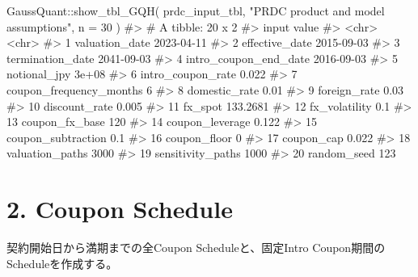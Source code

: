 \documentclass[
  letterpaper,
  DIV=11,
  numbers=noendperiod]{scrreprt}
\newenvironment{Shaded}{\begin{snugshade}}{\end{snugshade}}
\newcommand{\AttributeTok}[1]{\textcolor[rgb]{0.40,0.45,0.13}{#1}}
\newcommand{\CommentTok}[1]{\textcolor[rgb]{0.37,0.37,0.37}{#1}}
\newcommand{\DecValTok}[1]{\textcolor[rgb]{0.68,0.00,0.00}{#1}}
\newcommand{\FunctionTok}[1]{\textcolor[rgb]{0.28,0.35,0.67}{#1}}
\newcommand{\NormalTok}[1]{\textcolor[rgb]{0.00,0.23,0.31}{#1}}
\newcommand{\SpecialCharTok}[1]{\textcolor[rgb]{0.37,0.37,0.37}{#1}}
\newcommand{\StringTok}[1]{\textcolor[rgb]{0.13,0.47,0.30}{#1}}
\begin{document}
\begin{Shaded}
\begin{Highlighting}[]
\NormalTok{GaussQuant}\SpecialCharTok{::}\FunctionTok{show\_tbl\_GQH}\NormalTok{(}
\NormalTok{  prdc\_input\_tbl,}
  \StringTok{"PRDC product and model assumptions"}\NormalTok{,}
  \AttributeTok{n =} \DecValTok{30}
\NormalTok{)}
\CommentTok{\#\textgreater{} \# A tibble: 20 x 2}
\CommentTok{\#\textgreater{}    input                   value     }
\CommentTok{\#\textgreater{}    \textless{}chr\textgreater{}                   \textless{}chr\textgreater{}     }
\CommentTok{\#\textgreater{}  1 valuation\_date          2023{-}04{-}11}
\CommentTok{\#\textgreater{}  2 effective\_date          2015{-}09{-}03}
\CommentTok{\#\textgreater{}  3 termination\_date        2041{-}09{-}03}
\CommentTok{\#\textgreater{}  4 intro\_coupon\_end\_date   2016{-}09{-}03}
\CommentTok{\#\textgreater{}  5 notional\_jpy            3e+08     }
\CommentTok{\#\textgreater{}  6 intro\_coupon\_rate       0.022     }
\CommentTok{\#\textgreater{}  7 coupon\_frequency\_months 6         }
\CommentTok{\#\textgreater{}  8 domestic\_rate           0.01      }
\CommentTok{\#\textgreater{}  9 foreign\_rate            0.03      }
\CommentTok{\#\textgreater{} 10 discount\_rate           0.005     }
\CommentTok{\#\textgreater{} 11 fx\_spot                 133.2681  }
\CommentTok{\#\textgreater{} 12 fx\_volatility           0.1       }
\CommentTok{\#\textgreater{} 13 coupon\_fx\_base          120       }
\CommentTok{\#\textgreater{} 14 coupon\_leverage         0.122     }
\CommentTok{\#\textgreater{} 15 coupon\_subtraction      0.1       }
\CommentTok{\#\textgreater{} 16 coupon\_floor            0         }
\CommentTok{\#\textgreater{} 17 coupon\_cap              0.022     }
\CommentTok{\#\textgreater{} 18 valuation\_paths         3000      }
\CommentTok{\#\textgreater{} 19 sensitivity\_paths       1000      }
\CommentTok{\#\textgreater{} 20 random\_seed             123}
\end{Highlighting}
\end{Shaded}

\section{2. Coupon Schedule}\label{coupon-schedule}

契約開始日から満期までの全Coupon Scheduleと、固定Intro
Coupon期間のScheduleを作成する。
\end{document}
